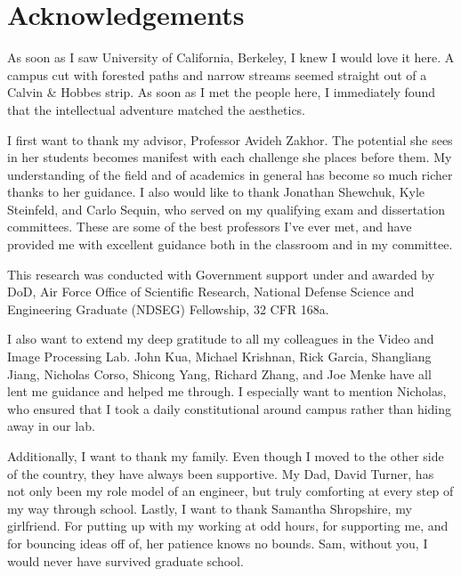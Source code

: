\documentclass[12pt,onecolumn,oneside]{book}
\begin{document}
\newpage
\cleardoublepage
{}
{}
\chapter*{Acknowledgements}

As soon as I saw University of California, Berkeley, I knew I would love it here.  A campus cut with forested paths and narrow streams seemed straight out of a Calvin \& Hobbes strip.  As soon as I met the people here, I immediately found that the intellectual adventure matched the aesthetics.

I first want to thank my advisor, Professor Avideh Zakhor.  The potential she sees in her students becomes manifest with each challenge she places before them.  My understanding of the field and of academics in general has become so much richer thanks to her guidance.  I also would like to thank Jonathan Shewchuk, Kyle Steinfeld, and Carlo Sequin, who served on my qualifying exam and dissertation committees.  These are some of the best professors I've ever met, and have provided me with excellent guidance both in the classroom and in my committee.

This research was conducted with Government support under and awarded by DoD, Air Force Office of Scientific Research, National Defense Science and Engineering Graduate (NDSEG) Fellowship, 32 CFR 168a.

I also want to extend my deep gratitude to all my colleagues in the Video and Image Processing Lab.  John Kua, Michael Krishnan, Rick Garcia, Shangliang Jiang, Nicholas Corso, Shicong Yang, Richard Zhang, and Joe Menke have all lent me guidance and helped me through.  I especially want to mention Nicholas, who ensured that I took a daily constitutional around campus rather than hiding away in our lab.

Additionally, I want to thank my family.  Even though I moved to the other side of the country, they have always been supportive.  My Dad, David Turner, has not only been my role model of an engineer, but truly comforting at every step of my way through school.  Lastly, I want to thank Samantha Shropshire, my girlfriend.  For putting up with my working at odd hours, for supporting me, and for bouncing ideas off of, her patience knows no bounds.  Sam, without you, I would never have survived graduate school.
\end{document}
